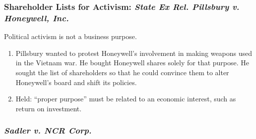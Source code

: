 \subsubsection{Shareholder Lists for Activism: \emph{State Ex Rel. Pillsbury v. 
Honeywell, Inc.}}

Political activism is not a business purpose.

\begin{enumerate}
    \item Pillsbury wanted to protest Honeywell's involvement in making weapons 
    used in the Vietnam war. He bought Honeywell shares solely for that purpose. 
    He sought the list of shareholders so that he could convince them to alter 
    Honeywell's board and shift its policies.
    \item Held: ``proper purpose'' must be related to an economic interest, such 
    as return on investment.
\end{enumerate}

\subsubsection{\emph{Sadler v. NCR Corp.}}

